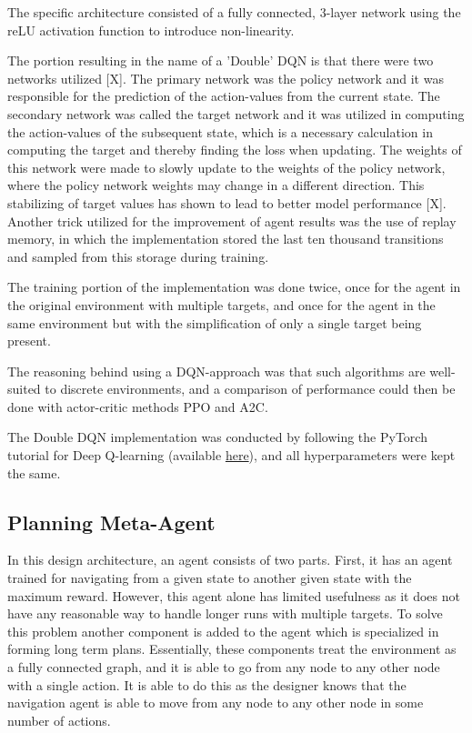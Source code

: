 \documentclass{article}
\begin{document}
        The specific architecture consisted of a fully connected, 3-layer network using the reLU activation function to introduce non-linearity.

        The portion resulting in the name of a 'Double' DQN is that there were two networks utilized [X]. The primary network was the policy network and it was responsible for the prediction of the action-values from the current state. The secondary network was called the target network and it was utilized in computing the action-values of the subsequent state, which is a necessary calculation in computing the target and thereby finding the loss when updating. The weights of this network were made to slowly update to the weights of the policy network, where the policy network weights may change in a different direction. This stabilizing of target values has shown to lead to better model performance [X]. Another trick utilized for the improvement of agent results was the use of replay memory, in which the implementation stored the last ten thousand transitions and sampled from this storage during training.

        The training portion of the implementation was done twice, once for the agent in the original environment with multiple targets, and once for the agent in the same environment but with the simplification of only a single target being present.

        The reasoning behind using a DQN-approach was that such algorithms are well-suited to discrete environments, and a comparison of performance could then be done with actor-critic methods PPO and A2C.

        The Double DQN implementation was conducted by following the PyTorch tutorial for Deep Q-learning (available \href{https://pytorch.org/tutorials/intermediate/reinforcement_q_learning.html}{here}), and all hyperparameters were kept the same.


     \subsection{Planning Meta-Agent}
    \label{planning}
    In this design architecture, an agent consists of two parts. First, it has an agent trained for navigating from a given state to another given state with the maximum reward. However, this agent alone has limited usefulness as it does not have any reasonable way to handle longer runs with multiple targets. To solve this problem another component is added to the agent which is specialized in forming long term plans. Essentially, these components treat the environment as a fully connected graph, and it is able to go from any node to any other node with a single action. It is able to do this as the designer knows that the navigation agent is able to move from any node to any other node in some number of actions.
    
\end{document}

